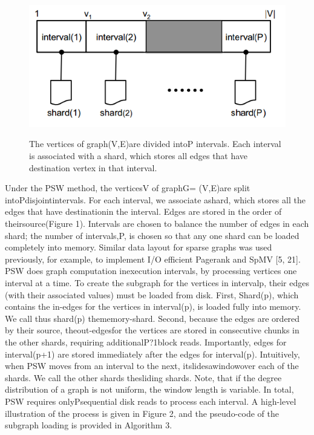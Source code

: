 \documentclass {article}
\begin{document}
\begin{figure}
  \centering
  \includegraphics[width=\textwidth]{vertex_interval}\\
  \caption{The vertices of graph(V,E)are divided intoP
intervals. Each interval is associated with a shard, which
stores all edges that have destination vertex in that interval.}\label{vertex_int}
\end{figure}


Under the PSW method, the verticesV of graphG=
(V,E)are split intoPdisjointintervals. For each interval,
we associate ashard, which stores all the edges that have
destinationin the interval. Edges are stored in the order of
theirsource(Figure 1). Intervals are chosen to balance the
number of edges in each shard; the number of intervals,P,
is chosen so that any one shard can be loaded completely
into memory. Similar data layout for sparse graphs was
used previously, for example, to implement I/O efficient
Pagerank and SpMV [5, 21].
PSW does graph computation inexecution intervals,
by processing vertices one interval at a time. To create the
subgraph for the vertices in intervalp, their edges (with
their associated values) must be loaded from disk. First,
Shard(p), which contains the in-edges for the vertices
in interval(p), is loaded fully into memory. We call thus
shard(p) thememory-shard. Second, because the edges
are ordered by their source, theout-edgesfor the vertices
are stored in consecutive chunks in the other shards, requiring additionalP?1block reads. Importantly, edges for
interval(p+1) are stored immediately after the edges for
interval(p). Intuitively, when PSW moves from an interval
to the next, itslidesawindowover each of the shards. We
call the other shards thesliding shards. Note, that if the
degree distribution of a graph is not uniform, the window
length is variable. In total, PSW requires onlyPsequential
disk reads to process each interval. A high-level illustration
of the process is given in Figure 2, and the pseudo-code of
the subgraph loading is provided in Algorithm 3.
\end{document}
